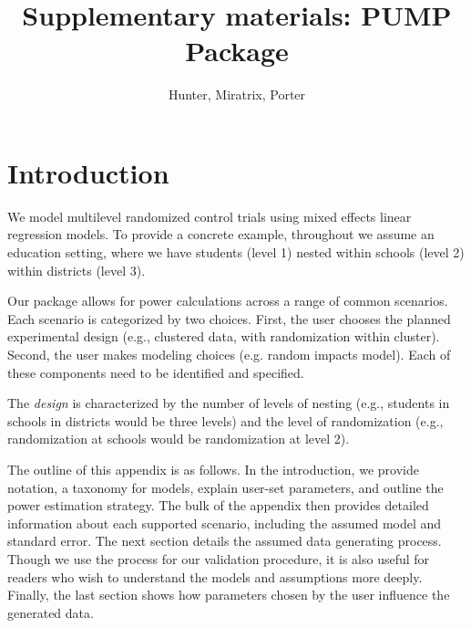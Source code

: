 \documentclass[12pt]{article}
\begin{document}
\author{Hunter, Miratrix, Porter}
\title{Supplementary materials: PUMP Package}

\maketitle

\tableofcontents 


\section{Introduction}
\label{sec:intro}

We model multilevel randomized control trials using mixed effects linear regression models.
To provide a concrete example, throughout we assume an education setting, where we have students (level 1) nested within schools (level 2) within districts (level 3).

Our package allows for power calculations across a range of common scenarios.
Each scenario is categorized by two choices.
First, the user chooses the planned experimental design (e.g., clustered data, with randomization within cluster).
Second, the user makes modeling choices (e.g. random impacts model).
Each of these components need to be identified and specified.

The \emph{design} is characterized by the number of levels of nesting (e.g., students in schools in districts would be three levels) and the level of randomization (e.g., randomization at schools would be randomization at level 2).

The outline of this appendix is as follows.
In the introduction, we provide notation, a taxonomy for models, explain user-set parameters, and outline the power estimation strategy.
The bulk of the appendix then provides detailed information about each supported scenario, including the assumed model and standard error.
The next section details the assumed data generating process.
Though we use the process for our validation procedure, it is also useful for readers who wish to understand the models and assumptions more deeply.
Finally, the last section shows how parameters chosen by the user influence the generated data.

\end{document}
